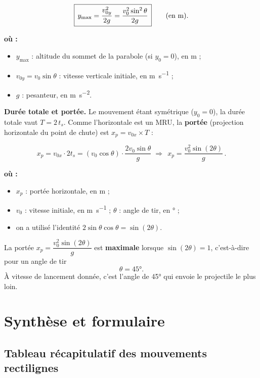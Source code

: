 \documentclass[11pt,a4paper]{article}
\newenvironment{ou}{%
  \par\smallskip\noindent\textbf{où :}\nopagebreak
  \begin{itemize}[leftmargin=1.8em,topsep=2pt,itemsep=1.5pt,parsep=0pt]}%
  {\end{itemize}}
\begin{document}
\begin{formule}
\[ \boxed{\,y_{\max}=\frac{v_{0y}^2}{2g}=\frac{v_0^2\sin^2\theta}{2g}\,}
   \qquad(\text{en \si{\metre}}). \]
\begin{ou}
  \item $y_{\max}$ : altitude du sommet de la parabole (si $y_0=0$), en \si{\metre} ;
  \item $v_{0y}=v_0\sin\theta$ : vitesse verticale initiale, en \si{\metre\per\second} ;
  \item $g$ : pesanteur, en \si{\metre\per\second\squared}.
\end{ou}
\end{formule}

\noindent\textbf{Durée totale et portée.} Le mouvement étant symétrique ($y_0=0$), la durée totale
vaut $T=2\,t_s$. Comme l'horizontale est un MRU, la \textbf{portée} (projection horizontale du
point de chute) est $x_p=v_{0x}\times T$ :

\begin{formule}
\[ x_p=v_{0x}\cdot 2t_s
      =(v_0\cos\theta)\cdot\frac{2v_0\sin\theta}{g}
   \;\Longrightarrow\;
   \boxed{\,x_p=\frac{v_0^2\sin(2\theta)}{g}\,}. \]
\begin{ou}
  \item $x_p$ : portée horizontale, en \si{\metre} ;
  \item $v_0$ : vitesse initiale, en \si{\metre\per\second} ; \quad $\theta$ : angle de tir, en \si{\degree} ;
  \item on a utilisé l'identité $2\sin\theta\cos\theta=\sin(2\theta)$.
\end{ou}
\end{formule}

\begin{theoreme}
La portée $x_p=\dfrac{v_0^2\sin(2\theta)}{g}$ est \textbf{maximale} lorsque $\sin(2\theta)=1$,
c'est-à-dire pour un angle de tir
\[ \boxed{\theta=\ang{45}}. \]
À vitesse de lancement donnée, c'est l'angle de \ang{45} qui envoie le projectile le plus loin.
\end{theoreme}

\section{Synthèse et formulaire}

\subsection{Tableau récapitulatif des mouvements rectilignes}
\end{document}
